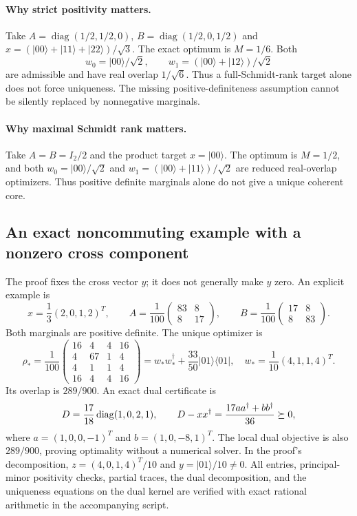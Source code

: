 

\paragraph{Why strict positivity matters.}
Take $A=\operatorname{diag}(1/2,1/2,0)$,
$B=\operatorname{diag}(1/2,0,1/2)$ and
$x=(|00\rangle+|11\rangle+|22\rangle)/\sqrt3$.
The exact optimum is $M=1/6$. Both
\[
 w_0=|00\rangle/\sqrt2,
 \qquad w_1=(|00\rangle+|12\rangle)/\sqrt2
\]
are admissible and have real overlap $1/\sqrt6$. Thus a full-Schmidt-rank
target alone does not force uniqueness. The missing positive-definiteness
assumption cannot be silently replaced by nonnegative marginals.

\paragraph{Why maximal Schmidt rank matters.}
Take $A=B=I_2/2$ and the product target $x=|00\rangle$. The optimum is
$M=1/2$, and both $w_0=|00\rangle/\sqrt2$ and
$w_1=(|00\rangle+|11\rangle)/\sqrt2$ are reduced real-overlap
optimizers. Thus positive definite marginals alone do not give a unique
coherent core.

\subsection{An exact noncommuting example with a nonzero cross component}
The proof fixes the cross vector $y$; it does not generally make $y$ zero.
An explicit example is
\[
 x=\frac13(2,0,1,2)^T,\qquad
 A=\frac1{100}\begin{pmatrix}83&8\\8&17\end{pmatrix},\qquad
 B=\frac1{100}\begin{pmatrix}17&8\\8&83\end{pmatrix}.
\]
Both marginals are positive definite. The unique optimizer is
\[
 \rho_* =\frac1{100}
 \begin{pmatrix}
 16&4&4&16\\4&67&1&4\\4&1&1&4\\16&4&4&16
 \end{pmatrix}
 =w_*w_*^\dagger+\frac{33}{50}|01\rangle\langle01|,
 \quad w_*=\frac1{10}(4,1,1,4)^T.
\]
Its overlap is $289/900$. An exact dual certificate is
\[
 D=\frac{17}{18}\operatorname{diag}(1,0,2,1),\qquad
 D-xx^\dagger=\frac{17aa^\dagger+bb^\dagger}{36}\succeq0,
\]
where $a=(1,0,0,-1)^T$ and $b=(1,0,-8,1)^T$. The local dual objective is also $289/900$, proving optimality without a numerical solver.
In the proof's decomposition, $z=(4,0,1,4)^T/10$ and $y=|01\rangle/10\ne0$.
All entries, principal-minor positivity checks, partial traces, the dual decomposition, and the uniqueness equations on the dual kernel are verified with exact rational arithmetic in the accompanying script.

